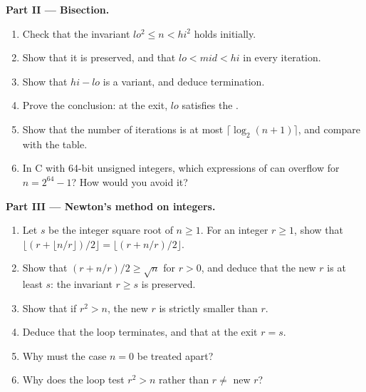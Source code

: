 \begin{problem}
\medskip\noindent\textbf{Part II --- Bisection.}
\begin{enumerate}[resume]
\item Check that the invariant $lo^2 \leq n < hi^2$ holds initially.
\item Show that it is preserved, and that $lo < mid < hi$ in every iteration.
\item Show that $hi - lo$ is a variant, and deduce termination.
\item Prove the conclusion: at the exit, $lo$ satisfies the .
\item Show that the number of iterations is at most $\lceil \log_2 (n + 1) \rceil$, and compare with the table.
\item In C with 64-bit unsigned integers, which expressions of  can overflow for $n = 2^{64} - 1$? How
would you avoid it?
\end{enumerate}

\medskip\noindent\textbf{Part III --- Newton's method on integers.}
\begin{enumerate}[resume]
\item Let $s$ be the integer square root of $n \geq 1$. For an integer $r \geq 1$, show that $\lfloor (r + \lfloor n/r
\rfloor)/2 \rfloor = \lfloor (r + n/r)/2 \rfloor$.
\item Show that $(r + n/r)/2 \geq \sqrt{n}$ for $r > 0$, and deduce that the new $r$ is at least $s$: the invariant
$r \geq s$ is preserved.
\item Show that if $r^2 > n$, the new $r$ is strictly smaller than $r$.
\item Deduce that the loop terminates, and that at the exit $r = s$.
\item Why must the case $n = 0$ be treated apart?
\item Why does the loop test $r^2 > n$ rather than $r \neq$ new $r$?
\end{enumerate}


\end{problem}
